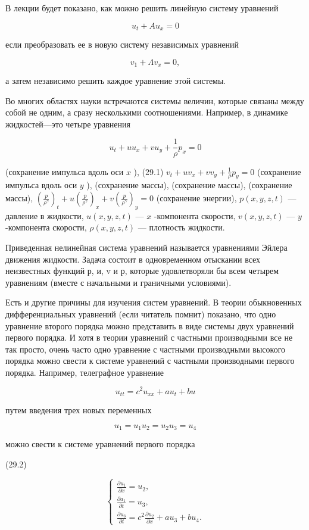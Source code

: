 \documentclass[
  ukrainian,
]{article}
\begin{document}
В лекции будет показано, как можно решить линейную систему уравнений

\[
u_t + Au_x = 0
\]

если преобразовать ее в новую систему независимых уравнений

\[
v_1 + \Lambda v_x = 0,
\]

а затем независимо решить каждое уравнение этой системы.

Во многих областях науки встречаются системы величин, которые связаны
между собой не одним, а сразу несколькими соотношениями. Например, в
динамике жидкостей---это четыре уравнения

\[
u_t + uu_x + vu_y + \frac{1}{\rho} p_x = 0
\]

(сохранение импульса вдоль оси \(x\) ), (29.1)
\(v_t + uv_x + vv_y + \frac{1}{\rho} p_y = 0\) (сохранение импульса
вдоль оси \(y\) ), (сохранение массы), (сохранение массы), (сохранение
массы),
\(\left(\frac{p}{\rho^{\gamma}}\right)_t + u\left(\frac{p}{\rho^{\gamma}}\right)_x + v\left(\frac{p}{\rho^{\gamma}}\right)_y = 0\)
(сохранение энергии), \(p(x, y, z, t)\) --- давление в жидкости,
\(u(x, y, z, t)\) --- \(x\) -компонента скорости, \(v(x, y, z, t)\) ---
\(y\) -компонента скорости, \(\rho(x, y, z, t)\) --- плотность жидкости.

Приведенная нелинейная система уравнений называется уравнениями Эйлера
движения жидкости. Задача состоит в одновременном отыскании всех
неизвестных функций р, и, v и р, которые удовлетворяли бы всем четырем
уравнениям (вместе с начальными и граничными условиями).

Есть и другие причины для изучения систем уравнений. В теории
обыкновенных дифференциальных уравнений (если читатель помнит) показано,
что одно уравнение второго порядка можно представить в виде системы двух
уравнений первого порядка. И хотя в теории уравнений с частными
производными все не так просто, очень часто одно уравнение с частными
производными высокого порядка можно свести к системе уравнений с
частными производными первого порядка. Например, телеграфное уравнение

\[
u_{tt} = c^2 u_{xx} + a u_t + b u
\]

путем введения трех новых переменных

\[
u_1 = u_1
u_2 = u_2
u_3 = u_4
\]

можно свести к системе уравнений первого порядка

(29.2)

\[
\begin{cases} \frac{\partial u_1}{\partial x} = u_2, \\ \frac{\partial a_1}{\partial t} = u_3, \\ \frac{\partial u_3}{\partial t} = c^2 \frac{\partial u_2}{\partial x} + au_3 + bu_4. \end{cases}
\]
\end{document}

